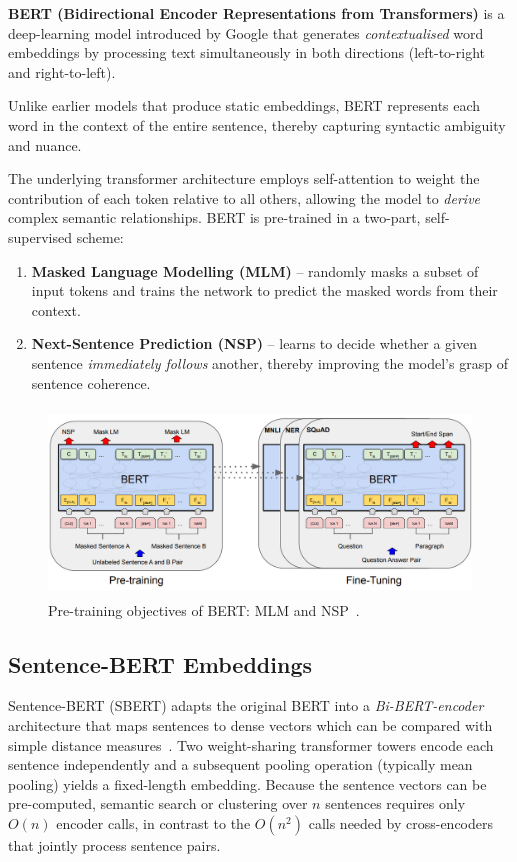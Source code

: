 \documentclass{SGGW-thesis-EN}
\begin{document}
\textbf{BERT (Bidirectional Encoder Representations from Transformers)} is a deep-learning model introduced by Google that generates 
\emph{contextualised} word embeddings by processing text simultaneously in both directions (left-to-right and right-to-left).

Unlike earlier models that produce static embeddings, BERT represents each word in the context of the entire sentence, thereby capturing syntactic ambiguity and nuance.

The underlying transformer architecture employs self-attention to weight the contribution of each token relative to all others, allowing 
the model to \emph{derive} complex semantic relationships.
BERT is pre-trained in a two-part, self-supervised scheme:
\begin{enumerate}
  \item \textbf{Masked Language Modelling (MLM)} – randomly masks a subset of input tokens and trains the network to predict the 
        masked words from their context.
  \item \textbf{Next-Sentence Prediction (NSP)} – learns to decide whether a given sentence \emph{immediately follows} another, 
        thereby improving the model’s grasp of sentence coherence.
\end{enumerate}

\begin{figure}[h]
  \centering
  \includegraphics[height=5cm]{images/bert_procedures.png}
  \caption{Pre-training objectives of BERT: MLM and NSP~\cite{devlin2019bertpretrainingdeepbidirectional}.}
  \label{fig:bert_procedures}
\end{figure}

\subsection{Sentence-BERT Embeddings}
Sentence-BERT (SBERT) adapts the original BERT into a \emph{Bi-BERT-encoder} architecture that
maps sentences to dense vectors which can be compared with simple distance measures~\cite{reimers2019sbert}.
Two weight-sharing transformer towers encode each sentence independently and a subsequent pooling
operation (typically mean pooling) yields a fixed-length embedding.
Because the sentence vectors can be pre-computed, semantic search or clustering over \(n\)
sentences requires only \(O(n)\) encoder calls, in contrast to the \(O(n^{2})\) calls needed by
cross-encoders that jointly process sentence pairs.
\end{document}

